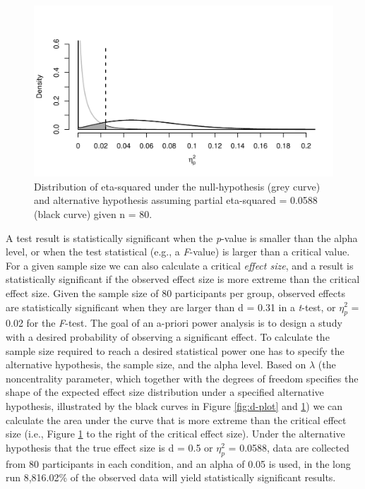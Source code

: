 \documentclass[
  ,man,floatsintext]{apa6}
\begin{document}
\begin{figure}
\centering
\includegraphics{0.1_Simulation_Based_Power_Analysis_For_Factorial_ANOVA_Designs_files/figure-latex/eta-plot-1.pdf}
\caption{\label{fig:eta-plot}Distribution of eta-squared under the null-hypothesis (grey curve) and alternative hypothesis assuming partial eta-squared = 0.0588 (black curve) given n = 80.}
\end{figure}

A test result is statistically significant when the \emph{p}-value is smaller than the alpha level, or when the test statistical (e.g., a \emph{F}-value) is larger than a critical value.
For a given sample size we can also calculate a critical \emph{effect size}, and a result is statistically significant if the observed effect size is more extreme than the critical effect size.
Given the sample size of 80 participants per group, observed effects are statistically significant when they are larger than d = 0.31 in a \emph{t}-test, or \(\eta_p^2\) = 0.02 for the \emph{F}-test.
The goal of an a-priori power analysis is to design a study with a desired probability of observing a significant effect.
To calculate the sample size required to reach a desired statistical power one has to specify the alternative hypothesis, the sample size, and the alpha level.
Based on \(\lambda\) (the noncentrality parameter, which together with the degrees of freedom specifies the shape of the expected effect size distribution under a specified alternative hypothesis, illustrated by the black curves in Figure \ref{fig:d-plot} and \ref{fig:eta-plot}) we can calculate the area under the curve that is more extreme than the critical effect size (i.e., Figure \ref{fig:eta-plot} to the right of the critical effect size).
Under the alternative hypothesis that the true effect size is d = 0.5 or \(\eta_p^2\) = 0.0588, data are collected from 80 participants in each condition, and an alpha of 0.05 is used, in the long run 8,816.02\% of the observed data will yield statistically significant results.
\end{document}
